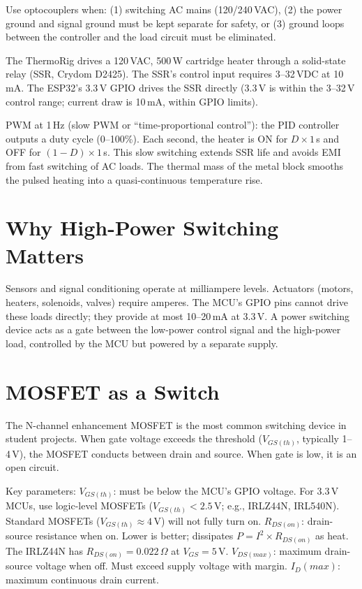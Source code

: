 \documentclass[11pt,letterpaper,twoside,openany]{book}
\begin{document}
Use optocouplers when: (1) switching AC mains (120/240\,VAC), (2) the power ground and signal ground must be kept separate for safety, or (3) ground loops between the controller and the load circuit must be eliminated.

\begin{examplebox}
The ThermoRig drives a 120\,VAC, 500\,W cartridge heater through a solid-state relay (SSR, Crydom D2425). The SSR's control input requires 3--32\,VDC at 10\,mA. The ESP32's 3.3\,V GPIO drives the SSR directly (3.3\,V is within the 3--32\,V control range; current draw is 10\,mA, within GPIO limits).

PWM at 1\,Hz (slow PWM or ``time-proportional control''): the PID controller outputs a duty cycle (0--100\%). Each second, the heater is ON for $D \times 1$\,s and OFF for $(1-D) \times 1$\,s. This slow switching extends SSR life and avoids EMI from fast switching of AC loads. The thermal mass of the metal block smooths the pulsed heating into a quasi-continuous temperature rise.
\end{examplebox}


\section{Why High-Power Switching Matters}
Sensors and signal conditioning operate at milliampere levels. Actuators (motors, heaters, solenoids, valves) require amperes. The MCU's GPIO pins cannot drive these loads directly; they provide at most 10--20\,mA at 3.3\,V. A power switching device acts as a gate between the low-power control signal and the high-power load, controlled by the MCU but powered by a separate supply.

\section{MOSFET as a Switch}
The N-channel enhancement MOSFET is the most common switching device in student projects. When gate voltage exceeds the threshold ($V_{GS(th)}$, typically 1--4\,V), the MOSFET conducts between drain and source. When gate is low, it is an open circuit.

Key parameters: \textbf{$V_{GS(th)}$}: must be below the MCU's GPIO voltage. For 3.3\,V MCUs, use logic-level MOSFETs ($V_{GS(th)} < 2.5$\,V; e.g., IRLZ44N, IRL540N). Standard MOSFETs ($V_{GS(th)} \approx 4$\,V) will not fully turn on. \textbf{$R_{DS(on)}$}: drain-source resistance when on. Lower is better; dissipates $P = I^2 \times R_{DS(on)}$ as heat. The IRLZ44N has $R_{DS(on)} = 0.022\,\Omega$ at $V_{GS} = 5$\,V. \textbf{$V_{DS(max)}$}: maximum drain-source voltage when off. Must exceed supply voltage with margin. \textbf{$I_D(max)$}: maximum continuous drain current.
\end{document}
